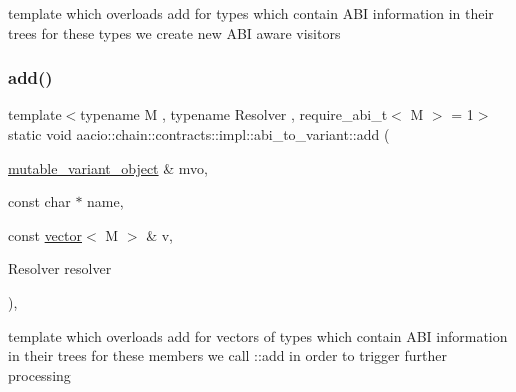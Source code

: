 template which overloads add for types which contain A\+BI information in their trees for these types we create new A\+BI aware visitors \mbox{\label{structaacio_1_1chain_1_1contracts_1_1impl_1_1abi__to__variant_ac7a9ba9de94f296c9d34a7dc5ada10df}} 
\subsubsection{\texorpdfstring{add()}{add()}\hspace{0.1cm}{\footnotesize\ttfamily [3/5]}}
{\footnotesize\ttfamily template$<$typename M , typename Resolver , require\+\_\+abi\+\_\+t$<$ M $>$  = 1$>$ \\
static void aacio\+::chain\+::contracts\+::impl\+::abi\+\_\+to\+\_\+variant\+::add (\begin{DoxyParamCaption}\item[{\mbox{\hyperlink{classfc_1_1mutable__variant__object}{mutable\+\_\+variant\+\_\+object}} \&}]{mvo,  }\item[{const char $\ast$}]{name,  }\item[{const \mbox{\hyperlink{classstd_1_1vector}{vector}}$<$ M $>$ \&}]{v,  }\item[{Resolver}]{resolver }\end{DoxyParamCaption})\hspace{0.3cm}{\ttfamily [inline]}, {\ttfamily [static]}}

template which overloads add for vectors of types which contain A\+BI information in their trees for these members we call \+::add in order to trigger further processing \mbox{\label{structaacio_1_1chain_1_1contracts_1_1impl_1_1abi__to__variant_a12653d9043d4c955b43b3555d88a21e9}} 
